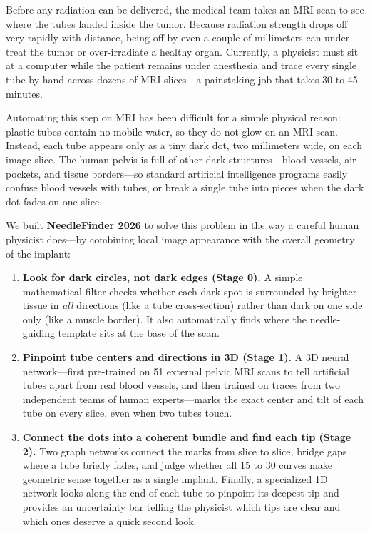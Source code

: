 \documentclass[
  11pt,
]{article}
\providecommand{\tightlist}{%
  \setlength{\itemsep}{0pt}\setlength{\parskip}{0pt}}
\begin{document}
Before any radiation can be delivered, the medical team takes an MRI
scan to see where the tubes landed inside the tumor. Because radiation
strength drops off very rapidly with distance, being off by even a
couple of millimeters can under-treat the tumor or over-irradiate a
healthy organ. Currently, a physicist must sit at a computer while the
patient remains under anesthesia and trace every single tube by hand
across dozens of MRI slices---a painstaking job that takes 30 to 45
minutes.

Automating this step on MRI has been difficult for a simple physical
reason: plastic tubes contain no mobile water, so they do not glow on an
MRI scan. Instead, each tube appears only as a tiny dark dot, two
millimeters wide, on each image slice. The human pelvis is full of other
dark structures---blood vessels, air pockets, and tissue borders---so
standard artificial intelligence programs easily confuse blood vessels
with tubes, or break a single tube into pieces when the dark dot fades
on one slice.

We built \textbf{NeedleFinder 2026} to solve this problem in the way a
careful human physicist does---by combining local image appearance with
the overall geometry of the implant:

\begin{enumerate}
\def\labelenumi{\arabic{enumi}.}
\tightlist
\item
  \textbf{Look for dark circles, not dark edges (Stage 0).} A simple
  mathematical filter checks whether each dark spot is surrounded by
  brighter tissue in \emph{all} directions (like a tube cross-section)
  rather than dark on one side only (like a muscle border). It also
  automatically finds where the needle-guiding template sits at the base
  of the scan.
\item
  \textbf{Pinpoint tube centers and directions in 3D (Stage 1).} A 3D
  neural network---first pre-trained on 51 external pelvic MRI scans to
  tell artificial tubes apart from real blood vessels, and then trained
  on traces from two independent teams of human experts---marks the
  exact center and tilt of each tube on every slice, even when two tubes
  touch.
\item
  \textbf{Connect the dots into a coherent bundle and find each tip
  (Stage 2).} Two graph networks connect the marks from slice to slice,
  bridge gaps where a tube briefly fades, and judge whether all 15 to 30
  curves make geometric sense together as a single implant. Finally, a
  specialized 1D network looks along the end of each tube to pinpoint
  its deepest tip and provides an uncertainty bar telling the physicist
  which tips are clear and which ones deserve a quick second look.
\end{enumerate}
\end{document}
